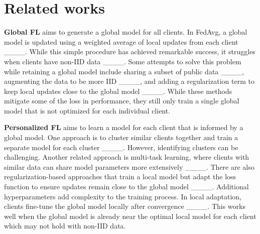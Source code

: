\section{Related works}
\textbf{Global FL} aims to generate a global model for all clients. In FedAvg, a global model is updated using a weighted average of local updates from each client ____. While this simple procedure has achieved remarkable success, it struggles when clients have non-IID data ____. Some attempts to solve this problem while retaining a global model include sharing a subset of public data ____, augmenting the data to be more IID ____, and adding a regularization term to keep local updates close to the global model ____. While these methods mitigate some of the loss in performance, they still only train a single global model that is not optimized for each individual client.

\textbf{Personalized FL} aims to learn a model for each client that is informed by a global model. One approach is to cluster similar clients together and train a separate model for each cluster ____. However, identifying clusters can be challenging. Another related approach is multi-task learning, where clients with similar data can share model parameters more extensively ____. There are also regularization-based approaches that train a local model but adapt the loss function to ensure updates remain close to the global model ____. Additional hyperparameters add complexity to the training process. In local adaptation, clients fine-tune the global model locally after convergence ____. This works well when the global model is already near the optimal local model for each client which may not hold with non-IID data.

